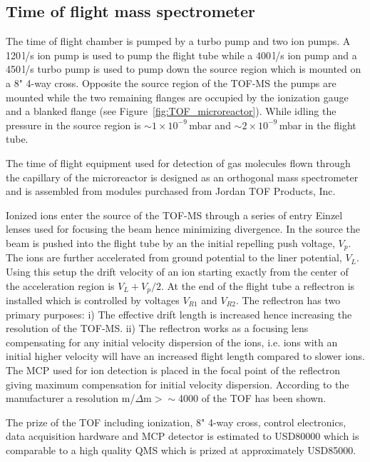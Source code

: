 \documentclass[aip,rsi]{revtex4-1}
\begin{document}
\subsection{Time of flight mass spectrometer}
The time of flight chamber is pumped by a turbo pump and two ion pumps. A 120\,l/s ion pump is used to pump the flight tube while a 400\,l/s ion pump and a 450\,l/s turbo pump is used to pump down the source region which is mounted on a 8" 4-way cross. Opposite the source region of the TOF-MS the pumps are mounted while the two remaining flanges are occupied by the ionization gauge and a blanked flange (see Figure~\ref{fig:TOF_microreactor}). While idling the pressure in the source region is $\sim1\times10^{-9}$\,mbar and $\sim2\times10^{-9}$\,mbar in the flight tube.

The time of flight equipment used for detection of gas molecules flown through the capillary of the microreactor is designed as an orthogonal mass spectrometer and is assembled from modules purchased from Jordan TOF Products, Inc\cite{JordanHomepage}. 

Ionized ions enter the source of the TOF-MS through a series of entry Einzel lenses used for focusing the beam hence minimizing divergence. In the source the beam is pushed into the flight tube by an the initial repelling push voltage, $V_p$. The ions are further accelerated from ground potential to the liner potential, $V_L$. Using this setup the drift velocity of an ion starting exactly from the center of the acceleration region is $V_L + V_p/2$. At the end of the flight tube a reflectron is installed which is controlled by voltages $V_{R1}$ and $V_{R2}$. The reflectron has two primary purposes: i) The effective drift length is increased hence increasing the resolution of the TOF-MS. ii) The reflectron works as a focusing lens compensating for any initial velocity dispersion of the ions, i.e. ions with an initial higher velocity will have an increased flight length compared to slower ions. The MCP used for ion detection is placed in the focal point of the reflectron giving maximum compensation for initial velocity dispersion. According to the manufacturer a resolution m/$\Delta$m$>\sim$4000 of the TOF has been shown.

The prize of the TOF including ionization, 8" 4-way cross, control electronics, data acquisition hardware and MCP detector is estimated to USD80000 which is comparable to a high quality QMS which is prized at approximately USD85000.
\end{document}
